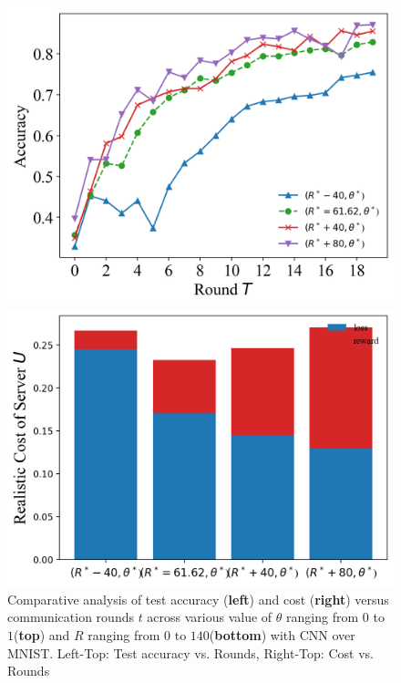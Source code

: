 \documentclass{article}
\theoremstyle{plain}
\theoremstyle{definition}
\theoremstyle{remark}
\begin{document}
\begin{figure}
\begin{minipage}{0.49\linewidth}
		\centerline{\includegraphics[width=\textwidth]{figures/figure_74_B.png}}
	\end{minipage}
	\begin{minipage}{0.49\linewidth}
		\centerline{\includegraphics[width=\textwidth]{figures/figure_75_B.png}}
	\end{minipage}
	\caption{Comparative analysis of test accuracy (\textbf{left}) and cost (\textbf{right}) versus communication rounds $t$ across various value of $\theta$ ranging from $0$ to $1$(\textbf{top}) and $R$ ranging from $0$ to $140$(\textbf{bottom}) with CNN over MNIST. Left-Top: Test accuracy vs. Rounds, Right-Top: Cost vs. Rounds}
  \label{fig:server_cost_mnist}
\end{figure}
\end{document}
